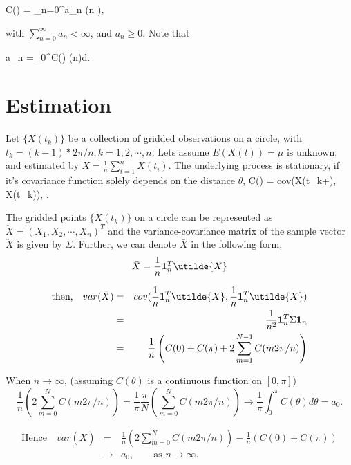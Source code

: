 \beq
C(\theta) = \sum_{n=0}^\infty a_n \cos(n \theta),
\eeq

with $\sum_{n = 0}^\infty a_n < \infty$, and $a_n \ge 0$. Note that

\beq
a_n  =\int_0^\pi C(\theta) \cos(n\theta)d\theta.
\eeq 




\section{Estimation}


Let $\{X(t_k)\}$ be a collection of gridded observations on a circle, with $t_k = (k-1)*2\pi/n, k = 1, 2, \cdots, n$. Lets assume $E(X(t)) = \mu$ is unknown, and estimated by $\bar{X} = \frac{1}{n}\sum_{i=1}^{n} X(t_i)$. The underlying process is stationary, if it's covariance function solely depends on the distance $\theta$,
\beq
C(\theta) = cov(X(t_k+\theta), X(t_k)), \quad \quad \theta \in [0, \pi].
\eeq


The gridded points $\{X(t_k)\}$ on a circle can be represented as $\utilde{X} = (X_1, X_2, \cdots, X_n)^T$ and the variance-covariance matrix of the sample vector $\utilde{X} $ is given by $\Sigma$. Further, we can denote $\bar{X}$ in the following form,
\[
	\bar{X} = \frac{1}{n}{\bf 1}_n^T \utilde{X}
\]

\begin{eqnarray}
	\mbox{then,} \quad var(\bar{X}) &=& cov(\frac{1}{n}{\bf 1}_n^T \utilde{X}, \frac{1}{n}{\bf 1}_n^T \utilde{X}) \nonumber \\
	&=& \frac{1}{n^2}{\bf 1}_n^T \Sigma {\bf 1}_n \nonumber \\
	&=& \frac{1}{n} \left(C(0)+C(\pi)+2 \sum_{m=1}^{N-1}C(m 2\pi/n)\right) \nonumber
\end{eqnarray}

When $n \to \infty$, (assuming $C(\theta)$ is a continuous function on $[0, \pi]$)
\[
	\frac{1}{n} \left(2 \sum_{m=0}^{N}C(m 2\pi/n)\right) = \frac{1}{\pi} \frac{\pi}{N} \left( \sum_{m=0}^{N}C(m 2\pi/n)\right) \to \frac{1}{\pi} \int_0^\pi C(\theta)d\theta = a_0.
\]

\begin{eqnarray*}
	\mbox{Hence} \quad	var(\bar{X}) &=& \frac{1}{n} \left(2 \sum_{m=0}^{N}C(m 2\pi/n)\right) - \frac{1}{n}(C(0) + C(\pi)) \\
	&\to & a_0, \quad \quad \mbox{as $n \to \infty$}.
\end{eqnarray*}

